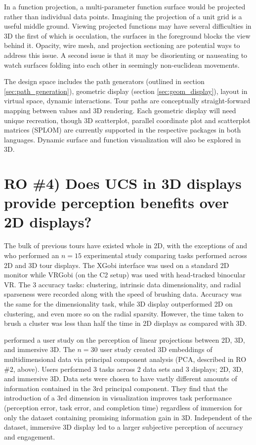 \documentclass{monashthesis}
\begin{document}
In a function projection, a multi-parameter function surface would be
projected rather than individual data points. Imagining the projection
of a unit grid is a useful middle ground. Viewing projected functions
may have several difficulties in 3D the first of which is occulation,
the surfaces in the foreground blocks the view behind it. Opacity, wire
mesh, and projection sectioning are potential ways to address this
issue. A second issue is that it may be disorienting or nauseating to
watch surfaces folding into each other in seemingly non-euclidean
movements.

The design space includes the path generators (outlined in section
\ref{sec:path_generation}), geometric display (section
\ref{sec:geom_display}), layout in virtual space, dynamic interactions.
Tour paths are conceptually straight-forward mapping between values and
3D rendering. Each geometric display will need unique recreation, though
3D scatterplot, parallel coordinate plot and scatterplot matrices
(SPLOM) are currently supported in the respective packages in both
languages. Dynamic surface and function visualization will also be
explored in 3D.

\section{RO \#4) Does UCS in 3D displays provide perception benefits
over 2D displays?}\label{UCS_3dvs2d}

The bulk of previous tours have existed whole in 2D, with the exceptions
of \textcite{nelson_xgobi_1998} and \textcite{arms_benefits_1999} who
performed an \(n=15\) experimental study comparing tasks performed
across 2D and 3D tour displays. The XGobi interface was used on a
standard 2D monitor while VRGobi (on the C2 setup) was used with
head-tracked binocular VR. The 3 accuracy tasks: clustering, intrinsic
data dimensionality, and radial sparseness were recorded along with the
speed of brushing data. Accuracy was the same for the dimensionality
task, while 3D display outperformed 2D on clustering, and even more so
on the radial sparsity. However, the time taken to brush a cluster was
less than half the time in 2D displays as compared with 3D.

\textcite{wagner_filho_immersive_2018} performed a user study on the
perception of linear projections between 2D, 3D, and immersive 3D. The
\(n=30\) user study created 3D embeddings of multidimensional data via
principal component analysis (PCA, described in RO \#2, above). Users
performed 3 tasks across 2 data sets and 3 displays; 2D, 3D, and
immersive 3D. Data sets were chosen to have vastly different amounts of
information contained in the 3rd principal component. They find that the
introduction of a 3rd dimension in visualization improves task
performance (perception error, task error, and completion time)
regardless of immersion for only the dataset containing promising
information gain in 3D. Independent of the dataset, immersive 3D display
led to a larger subjective perception of accuracy and engagement.
\end{document}
